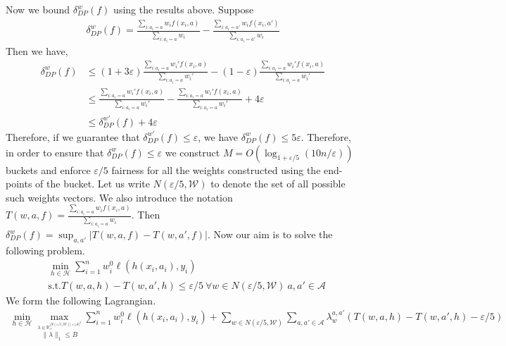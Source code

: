 \documentclass[11pt]{article}
\newcommand{\bbR}{\mathbb{R}}
\newcommand{\WW}{\mathcal{W}}
\newcommand{\abs}[1]{\left|#1\right|}
\newcommand{\Ac}{\mathcal{A}}
\newcommand{\HH}{\mathcal{H}}
\newcommand{\eps}{\varepsilon}
\newcommand{\norm}[1]{\lVert #1 \rVert}
\begin{document}
Now we bound $\delta^w_{DP}(f)$ using the results above. Suppose
\begin{align*}
\delta^w_{DP}(f) = \frac{\sum_{i: a_i = a} w_i f(x_i,a)}{\sum_{i: a_i = a} w_i} -  \frac{\sum_{i: a_i = a'} w_i f(x_i,a')}{\sum_{i: a_i = a'} w_i}
\end{align*}
Then we have,
\begin{align*}
\delta^w_{DP}(f) &\le (1+3\eps)  \frac{\sum_{i: a_i = a} w_i' f(x_i,a)}{\sum_{i: a_i = a} w_i'} - (1-\eps) \frac{\sum_{i: a_i = a} w_i' f(x_i,a)}{\sum_{i: a_i = a} w_i'}  \\
&\le  \frac{\sum_{i: a_i = a} w_i' f(x_i,a)}{\sum_{i: a_i = a} w_i'} -  \frac{\sum_{i: a_i = a} w_i' f(x_i,a)}{\sum_{i: a_i = a} w_i'} + 4\eps\\
&\le \delta^{w'}_{DP}(f) + 4\eps
\end{align*}
Therefore, if we guarantee that $\delta^{w'}_{DP}(f) \le \eps$, we have $\delta^w_{DP}(f) \le 5\eps$. Therefore, in order to ensure that $\delta^w_{DP}(f) \le \eps$ we construct $M = O(\log_{1+\eps/5}(10n/\eps) )$ buckets and enforce $\eps/5$ fairness for all the weights constructed using the end-points of the bucket. Let us write $N(\eps/5,\WW)$ to denote the set of all possible such weights vectors. We also introduce the notation $T(w,a,f) = \frac{\sum_{i: a_i = a} w_i f(x_i,a)}{\sum_{i: a_i = a} w_i}$. Then $\delta^w_{DP}(f) = \sup_{a,a'}\abs{T(w,a,f) - T(w,a',f)}$. Now our aim is to solve the following problem.
\begin{align}
&\min_{h \in \HH} \sum_{i=1}^n w^0_i \ell(h(x_i,a_i),y_i)\label{eq:final-objective}\\
&\text{s.t.} T(w,a,h) - T(w,a',h) \le \eps / 5\ \forall w \in N(\eps/5,\WW) \ a,a' \in \Ac \nonumber
\end{align}
We form the following Lagrangian.
\begin{align}\label{eq:lagrangian}
\min_{h \in \HH} \max_{\stackrel{\lambda \in \bbR^{\abs{N(\eps/5,\WW)} \times \abs{\Ac}^2}_+}{ \norm{\lambda}_1 \le B} } \sum_{i=1}^n w^0_i \ell(h(x_i,a_i),y_i) + \sum_{w \in N(\eps/5,\WW)} \sum_{a,a' \in \Ac} \lambda_w^{a,a'} ( T(w,a,h) - T(w,a',h) - \eps / 5)
\end{align}
\end{document}
